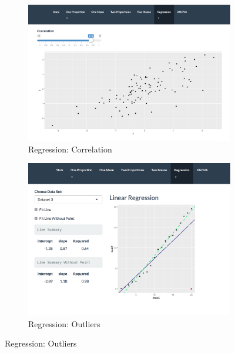 \documentclass[11pt]{book}
\begin{document}
\begin{figure}
        \centering
         \begin{subfigure}[b]{0.6\textwidth}
                \includegraphics[width=\textwidth]{Correlation.png}
                \caption{Regression: Correlation} 
                \label{fig: Correlation}
        \end{subfigure}
        
        \begin{subfigure}[b]{0.6\textwidth}
                \includegraphics[width=\textwidth]{Outliers.png}
                \caption{Regression: Outliers }
                \label{fig: Outliers}
        \end{subfigure}%


\end{figure}
\end{document}
